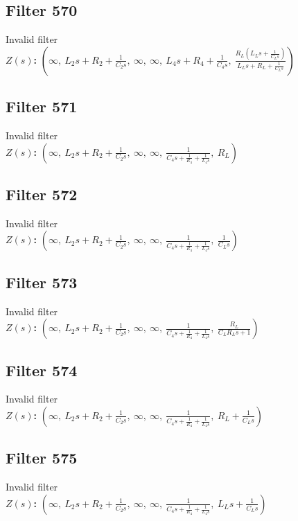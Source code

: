\documentclass{article}
\begin{document}
\subsection*{Filter 570}
Invalid filter \\ 
\textbf{$Z(s)$:} $\left( \infty, \  L_{2} s + R_{2} + \frac{1}{C_{2} s}, \  \infty, \  \infty, \  L_{4} s + R_{4} + \frac{1}{C_{4} s}, \  \frac{R_{L} \left(L_{L} s + \frac{1}{C_{L} s}\right)}{L_{L} s + R_{L} + \frac{1}{C_{L} s}}\right)$ \\ 
\subsection*{Filter 571}
Invalid filter \\ 
\textbf{$Z(s)$:} $\left( \infty, \  L_{2} s + R_{2} + \frac{1}{C_{2} s}, \  \infty, \  \infty, \  \frac{1}{C_{4} s + \frac{1}{R_{4}} + \frac{1}{L_{4} s}}, \  R_{L}\right)$ \\ 
\subsection*{Filter 572}
Invalid filter \\ 
\textbf{$Z(s)$:} $\left( \infty, \  L_{2} s + R_{2} + \frac{1}{C_{2} s}, \  \infty, \  \infty, \  \frac{1}{C_{4} s + \frac{1}{R_{4}} + \frac{1}{L_{4} s}}, \  \frac{1}{C_{L} s}\right)$ \\ 
\subsection*{Filter 573}
Invalid filter \\ 
\textbf{$Z(s)$:} $\left( \infty, \  L_{2} s + R_{2} + \frac{1}{C_{2} s}, \  \infty, \  \infty, \  \frac{1}{C_{4} s + \frac{1}{R_{4}} + \frac{1}{L_{4} s}}, \  \frac{R_{L}}{C_{L} R_{L} s + 1}\right)$ \\ 
\subsection*{Filter 574}
Invalid filter \\ 
\textbf{$Z(s)$:} $\left( \infty, \  L_{2} s + R_{2} + \frac{1}{C_{2} s}, \  \infty, \  \infty, \  \frac{1}{C_{4} s + \frac{1}{R_{4}} + \frac{1}{L_{4} s}}, \  R_{L} + \frac{1}{C_{L} s}\right)$ \\ 
\subsection*{Filter 575}
Invalid filter \\ 
\textbf{$Z(s)$:} $\left( \infty, \  L_{2} s + R_{2} + \frac{1}{C_{2} s}, \  \infty, \  \infty, \  \frac{1}{C_{4} s + \frac{1}{R_{4}} + \frac{1}{L_{4} s}}, \  L_{L} s + \frac{1}{C_{L} s}\right)$ \\ 
\end{document}
